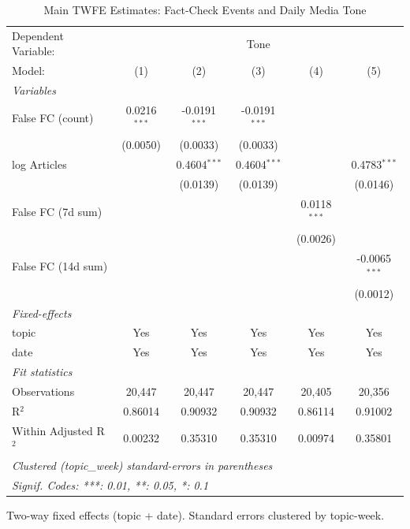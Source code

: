 
\begin{table}[htbp]
   \caption{\label{tab:main} Main TWFE Estimates: Fact-Check Events and Daily Media Tone}
   \centering
   \begin{tabular}{lccccc}
      \tabularnewline \midrule \midrule
      Dependent Variable: & \multicolumn{5}{c}{Tone}\\
      Model:                & (1)            & (2)             & (3)             & (4)            & (5)\\  
      \midrule
      \emph{Variables}\\
      False FC (count)      & 0.0216$^{***}$ & -0.0191$^{***}$ & -0.0191$^{***}$ &                &   \\   
                            & (0.0050)       & (0.0033)        & (0.0033)        &                &   \\   
      log Articles          &                & 0.4604$^{***}$  & 0.4604$^{***}$  &                & 0.4783$^{***}$\\   
                            &                & (0.0139)        & (0.0139)        &                & (0.0146)\\   
      False FC (7d sum)     &                &                 &                 & 0.0118$^{***}$ &   \\   
                            &                &                 &                 & (0.0026)       &   \\   
      False FC (14d sum)    &                &                 &                 &                & -0.0065$^{***}$\\   
                            &                &                 &                 &                & (0.0012)\\   
      \midrule
      \emph{Fixed-effects}\\
      topic                 & Yes            & Yes             & Yes             & Yes            & Yes\\  
      date                  & Yes            & Yes             & Yes             & Yes            & Yes\\  
      \midrule
      \emph{Fit statistics}\\
      Observations          & 20,447         & 20,447          & 20,447          & 20,405         & 20,356\\  
      R$^2$                 & 0.86014        & 0.90932         & 0.90932         & 0.86114        & 0.91002\\  
      Within Adjusted R$^2$ & 0.00232        & 0.35310         & 0.35310         & 0.00974        & 0.35801\\  
      \midrule \midrule
      \multicolumn{6}{l}{\emph{Clustered (topic\_week) standard-errors in parentheses}}\\
      \multicolumn{6}{l}{\emph{Signif. Codes: ***: 0.01, **: 0.05, *: 0.1}}\\
   \end{tabular}
   
   \par \raggedright 
   Two-way fixed effects (topic + date). Standard errors clustered by topic-week.
\end{table}



